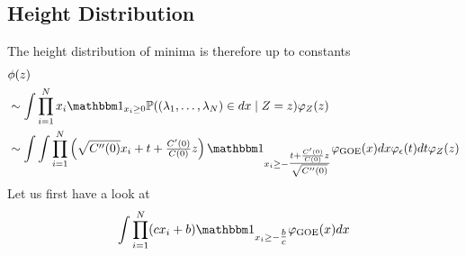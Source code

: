 \subsection{Height Distribution}

The height distribution
of minima is therefore up to constants
\[\begin{aligned}
	&\phi(z)\\
	&\sim\int \prod_{i=1}^\dimension x_i \ind_{x_i\ge 0}
	\Pr((\lambda_1,\dots,\lambda_\dimension)\in dx\mid Z=z) \varphi_Z(z)\\
	&\sim\int \int \prod_{i=1}^\dimension
	\left(\sqrt{\sqC''(0)}x_i + t + \tfrac{\sqC'(0)}{\sqC(0)}z\right)
	\ind_{x_i\ge - \tfrac{t+\frac{\sqC'(0)}{\sqC(0)}z}{\sqrt{\sqC''(0)}}}
	\varphi_{\text{GOE}}(x) dx \varphi_\epsilon(t)dt \varphi_Z(z)\\
\end{aligned}\]
Let us first have a look at
\[
	\int\prod_{i=1}^\dimension (c x_i + b) \ind_{x_i \ge -\tfrac{b}{c}}\varphi_{\text{GOE}}(x)dx
\]

